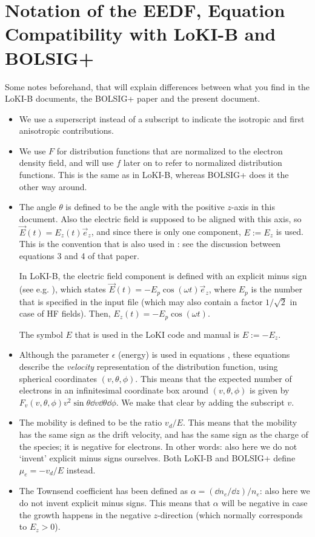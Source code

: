 \documentclass{book}
\begin{document}
\section{Notation of the EEDF, Equation Compatibility with LoKI-B and BOLSIG+}

\label{sec:compatibility}

\begin{framed}
Some notes beforehand, that will explain differences between what you find
in the LoKI-B documents, the BOLSIG+ paper and the present document.
\begin{itemize}
	\item We use a superscript instead of a subscript to indicate the isotropic
		and first anisotropic contributions.
	\item We use $F$ for distribution functions that are normalized to the
		electron density field, and will use $f$ later on to refer to
		normalized distribution functions. This is the same as in LoKI-B,
		whereas BOLSIG+ does it the other way around.
	\item The angle $\theta$ is defined to be the angle with the positive
		$z$-axis in this document. Also the electric field is supposed
		to be aligned with this axis, so $\vec{E}(t)=E_z(t)\vec{e}_z$,
		and since there is only one component, $E := E_z$ is used.
		This is the convention that is also used in \cite{Hagelaar2005}:
		see the discussion between equations 3 and 4 of that paper.

		In LoKI-B, the electric field component is defined with an explicit
		minus sign (see e.g. \cite[eq. 1]{Manual_2_2_0}), which states
		$\vec{E}(t)=-E_p\cos(\omega t)\vec{e}_z$, where $E_p$ is the number
		that is specified in the input file (which may also contain a factor
		$1/\sqrt{2}$ in case of HF fields). Then, $E_z(t)=-E_p\cos(\omega t)$.

		The symbol $E$ that is used in the LoKI code and manual is $E := -E_z$.
	\item Although the parameter $\epsilon$ (energy) is used in equations \cite[eq. 3--6]{Hagelaar2005},
		these equations describe the {\em velocity} representation of the
		distribution function, using spherical coordinates $(v,\theta,\phi)$.
		This means that the expected number of electrons in an infinitesimal
		coordinate box around $(v,\theta,\phi)$ is given by
		$F_v(v,\theta,\phi)v^2\sin\theta\dd{v}\dd{\theta}\dd{\phi}$.
		We make that clear by adding the subscript $v$.
	\item The mobility is defined to be the ratio $v_d/E$. This means that
		the mobility has the same sign as the drift velocity, and has
		the same sign as the charge of the species; it is negative for
		electrons. In other words: also here we do not `invent' explicit
		minus signs ourselves.
		Both LoKI-B and BOLSIG+ define $\mu_e=-v_d/E$ instead.
	\item The Townsend coefficient has been defined as
		$\alpha=(\dd{n_e}/\dd{z})/n_e$: also here we do not invent
		explicit minus signs. This means that $\alpha$ will be negative in case
		the growth happens in the negative $z$-direction (which normally
		corresponds to $E_z>0$).


\end{itemize}
\end{framed}
\end{document}
